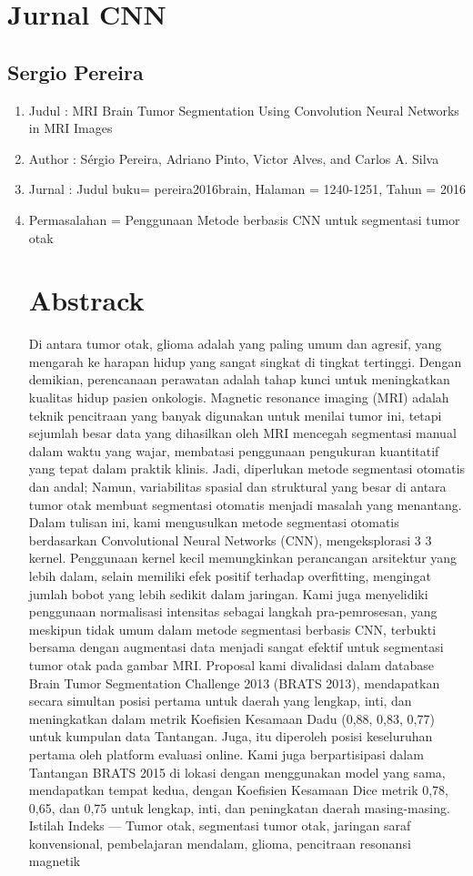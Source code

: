 \section{Jurnal CNN }
\subsection{Sergio Pereira}

\begin{enumerate}
  \item Judul : MRI Brain Tumor Segmentation Using Convolution Neural Networks in MRI Images
   \item Author : Sérgio Pereira, Adriano Pinto, Victor Alves, and Carlos A. Silva
    \item Jurnal : Judul buku= pereira2016brain, Halaman = 1240-1251, Tahun = 2016
     \item Permasalahan = Penggunaan Metode berbasis CNN untuk segmentasi tumor otak

     
\section{Abstrack}
Di antara tumor otak, glioma adalah yang paling umum dan agresif, yang mengarah ke harapan hidup yang sangat singkat di tingkat tertinggi. Dengan demikian, perencanaan perawatan adalah tahap kunci untuk meningkatkan kualitas hidup pasien onkologis. Magnetic resonance imaging (MRI) adalah teknik pencitraan yang banyak digunakan untuk menilai tumor ini, tetapi sejumlah besar data yang dihasilkan oleh MRI mencegah segmentasi manual dalam waktu yang wajar, membatasi penggunaan pengukuran kuantitatif yang tepat dalam praktik klinis. Jadi, diperlukan metode segmentasi otomatis dan andal; Namun, variabilitas spasial dan struktural yang besar di antara tumor otak membuat segmentasi otomatis menjadi masalah yang menantang. Dalam tulisan ini, kami mengusulkan metode segmentasi otomatis berdasarkan Convolutional Neural Networks (CNN), mengeksplorasi 3 3 kernel. Penggunaan kernel kecil memungkinkan perancangan arsitektur yang lebih dalam, selain memiliki efek positif terhadap overfitting, mengingat jumlah bobot yang lebih sedikit dalam jaringan. Kami juga menyelidiki penggunaan normalisasi intensitas sebagai langkah pra-pemrosesan, yang meskipun tidak umum dalam metode segmentasi berbasis CNN, terbukti bersama dengan augmentasi data menjadi sangat efektif untuk segmentasi tumor otak pada gambar MRI. Proposal kami divalidasi dalam database Brain Tumor Segmentation Challenge 2013 (BRATS
2013), mendapatkan secara simultan posisi pertama untuk daerah yang lengkap, inti, dan meningkatkan dalam metrik Koefisien Kesamaan Dadu (0,88, 0,83, 0,77) untuk kumpulan data Tantangan. Juga, itu diperoleh
posisi keseluruhan pertama oleh platform evaluasi online. Kami juga
berpartisipasi dalam Tantangan BRATS 2015 di lokasi dengan menggunakan model yang sama, mendapatkan tempat kedua, dengan Koefisien Kesamaan Dice
metrik 0,78, 0,65, dan 0,75 untuk lengkap, inti, dan peningkatan
daerah masing-masing.
Istilah Indeks — Tumor otak, segmentasi tumor otak, jaringan saraf konvensional, pembelajaran mendalam, glioma, pencitraan resonansi magnetik

\end{enumerate}
